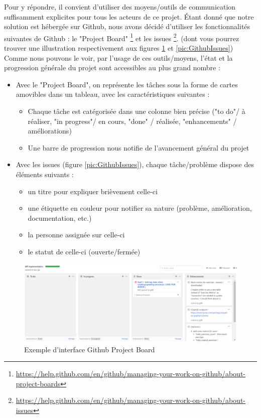 Pour y répondre, il convient d'utiliser des moyens/outils de communication suffisamment explicites pour tous les acteurs de ce projet. Étant donné que notre solution est hébergée sur Github, nous avons décidé d'utiliser les fonctionnalités suivantes de Github : le "Project Board" \footnote{\url{https://help.github.com/en/github/managing-your-work-on-github/about-project-boards}} et les issues \footnote{\url{https://help.github.com/en/github/managing-your-work-on-github/about-issues}}. (dont vous pourrez trouver une illustration respectivement aux figures \ref{pic:GithubBoard} et \ref{pic:GithubIssues})\\

Comme nous pouvons le voir, par l'usage de ces outils/moyens, l'état et la progression générale du projet sont accessibles au plus grand nombre : 
\begin{itemize}
    \item Avec le "Project Board", on représente les tâches sous la forme de cartes amovibles dans un tableau, avec les caractéristiques suivantes :
    \begin{itemize}
        \item Chaque tâche est catégorisée dans une colonne bien précise ("to do"/ à réaliser, "in progress"/ en cours, "done" / réalisée, "enhancements" / améliorations)
        \item Une barre de progression nous notifie de l'avancement général du projet
    \end{itemize}
    \item Avec les issues (figure \ref{pic:GithubIssues}), chaque tâche/problème dispose des éléments suivants : 
    \begin{itemize}
        \item un titre pour expliquer brièvement celle-ci
        \item une étiquette en couleur pour notifier sa nature (problème, amélioration, documentation, etc.)
        \item la personne assignée sur celle-ci
        \item le statut de celle-ci (ouverte/fermée)
    \end{itemize}
\end{itemize}


\begin{figure}[H]
    \includegraphics[width=\textwidth,height=\textheight,keepaspectratio]{images/trelloLike.PNG}
    \centering
    \caption{Exemple d'interface Github Project Board}
    \label{pic:GithubBoard}
\end{figure}

